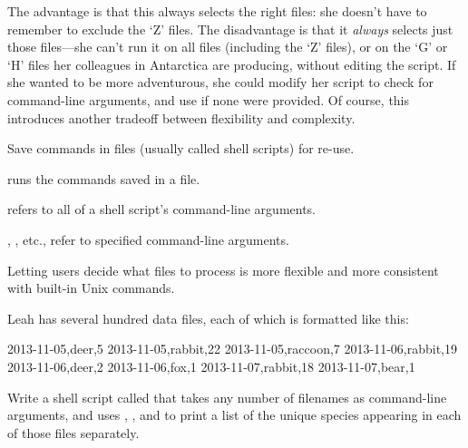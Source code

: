 
The advantage is that this always selects the right files: she doesn't
have to remember to exclude the `Z' files. The disadvantage is that it
\emph{always} selects just those files---she can't run it on all files
(including the `Z' files), or on the `G' or `H' files her colleagues in
Antarctica are producing, without editing the script. If she wanted to
be more adventurous, she could modify her script to check for
command-line arguments, and use  if none were
provided. Of course, this introduces another tradeoff between
flexibility and complexity.

\begin{keypoints}
\begin{swcitemize}
\item
  Save commands in files (usually called shell scripts) for re-use.
\item
   runs the commands saved in a file.
\item
  \code{\$*} refers to all of a shell script's command-line
  arguments.
\item
  , , etc., refer to specified command-line
  arguments.
\item
  Letting users decide what files to process is more flexible and more
  consistent with built-in Unix commands.
\end{swcitemize}
\end{keypoints}

\begin{challenge}
  Leah has several hundred data files, each of which is formatted like
  this:

\begin{VerbFile}
2013-11-05,deer,5
2013-11-05,rabbit,22
2013-11-05,raccoon,7
2013-11-06,rabbit,19
2013-11-06,deer,2
2013-11-06,fox,1
2013-11-07,rabbit,18
2013-11-07,bear,1
\end{VerbFile}

  \noindent
  Write a shell script called  that takes any number
  of filenames as command-line arguments, and uses ,
  , and  to print a list of the unique species
  appearing in each of those files separately.
\end{challenge}

